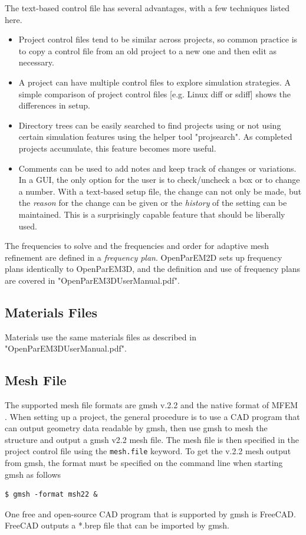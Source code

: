 \documentclass[titlepage]{article}
\renewcommand\_{\textunderscore\linebreak[1]}
\begin{document}
The text-based control file has several advantages, with a few techniques listed here.
\begin{itemize}[nosep]
  \item Project control files tend to be similar across projects, so common practice is to copy a control file from an old project to a new one and then edit as necessary.
  \item A project can have multiple control files to explore simulation strategies.  A simple comparison of project control files [e.g. Linux diff or sdiff] shows the differences in setup.
  \item Directory trees can be easily searched to find projects using or not using certain simulation features using the helper tool "proj\_search".  As completed projects accumulate, this feature becomes more useful.
  \item Comments can be used to add notes and keep track of changes or variations.  In a GUI, the only option for the user is to check/uncheck a box or to change a number.  With a text-based setup file, the change can not only be made, but the \textit{reason} for the change can be given or the \textit{history} of the setting can be maintained.  This is a surprisingly capable feature that should be liberally used.
\end{itemize}

The frequencies to solve and the frequencies and order for adaptive mesh refinement are defined in a \textit{frequency plan}.  OpenParEM2D sets up frequency plans identically to OpenParEM3D, and the definition and use of frequency plans are covered in "OpenParEM3D\_User\_Manual.pdf".

\subsection{Materials Files}

Materials use the same materials files as described in "OpenParEM3D\_User\_Manual.pdf".

\subsection{Mesh File}

The supported mesh file formats are gmsh v.2.2 and the native format of MFEM \cite{MFEM}\cite{MFEMweb}.  When setting up a project, the general procedure is to use a CAD program that can output geometry data readable by gmsh, then use gmsh to mesh the structure and output a gmsh v2.2 mesh file.  The mesh file is then specified in the project control file using the \texttt{mesh.file} keyword.  To get the v.2.2 mesh output from gmsh, the format must be specified on the command line when starting gmsh as follows
\begin{Verbatim}[fontsize=\small]
   $ gmsh -format msh22 &
\end{Verbatim}
\noindent One free and open-source CAD program that is supported by gmsh is FreeCAD.  FreeCAD outputs a *.brep file that can be imported by gmsh.
\end{document}
